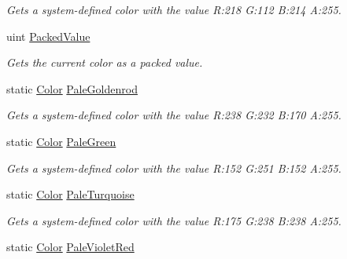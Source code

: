 \begin{DoxyCompactItemize}
\begin{DoxyCompactList}\small\item\em Gets a system-\/defined color with the value R\+:218 G\+:112 B\+:214 A\+:255.\end{DoxyCompactList}\item 
uint \hyperlink{structMicrosoft_1_1Xna_1_1Framework_1_1Color_a8474542fe5942f2aa19cbd6ff421f065}{Packed\+Value}
\begin{DoxyCompactList}\small\item\em Gets the current color as a packed value.\end{DoxyCompactList}\item 
static \hyperlink{structMicrosoft_1_1Xna_1_1Framework_1_1Color}{Color} \hyperlink{structMicrosoft_1_1Xna_1_1Framework_1_1Color_a03b8be214eb4552cb12d09e48c94727a}{Pale\+Goldenrod}
\begin{DoxyCompactList}\small\item\em Gets a system-\/defined color with the value R\+:238 G\+:232 B\+:170 A\+:255.\end{DoxyCompactList}\item 
static \hyperlink{structMicrosoft_1_1Xna_1_1Framework_1_1Color}{Color} \hyperlink{structMicrosoft_1_1Xna_1_1Framework_1_1Color_a57f99b43eb3f57bfed79627f6bdd0692}{Pale\+Green}
\begin{DoxyCompactList}\small\item\em Gets a system-\/defined color with the value R\+:152 G\+:251 B\+:152 A\+:255.\end{DoxyCompactList}\item 
static \hyperlink{structMicrosoft_1_1Xna_1_1Framework_1_1Color}{Color} \hyperlink{structMicrosoft_1_1Xna_1_1Framework_1_1Color_a9e94ed3f389e702f44427b210ff186ce}{Pale\+Turquoise}
\begin{DoxyCompactList}\small\item\em Gets a system-\/defined color with the value R\+:175 G\+:238 B\+:238 A\+:255.\end{DoxyCompactList}\item 
static \hyperlink{structMicrosoft_1_1Xna_1_1Framework_1_1Color}{Color} \hyperlink{structMicrosoft_1_1Xna_1_1Framework_1_1Color_a447a14b398611a08b6d15ed4b1b9350a}{Pale\+Violet\+Red}

\end{DoxyCompactItemize}
